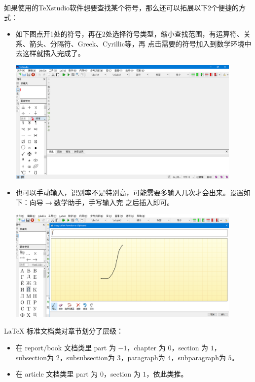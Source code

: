 如果使用的TeXstudio软件想要查找某个符号，那么还可以拓展以下2个便捷的方式：
\begin{itemize}
  \item 如下图点开1处的符号，再在2处选择符号类型，缩小查找范围，有运算符、关系、箭头、分隔符、Greek、Cyrillic等，再
  点击需要的符号加入到数学环境中去这样就插入完成了。

  \includegraphics[width=0.9\textwidth]{../images/5.png}
  \item 也可以手动输入，识别率不是特别高，可能需要多输入几次才会出来。设置如下：向导$\rightarrow$数学助手，手写输入完
  之后插入即可。

  \includegraphics[width=0.9\textwidth]{../images/image.png}
\end{itemize}





\LaTeX{} 标准文档类对章节划分了层级：
\begin{itemize}
  \item 在 report/book 文档类里 part 为 $-1$，chapter 为 $0$，section 为 $1$，
    subsection为 $2$，subsubsection为 $3$，paragraph为 $4$，subparagraph为 $5$。
  \item 在 article 文档类里 part 为 $0$，section 为 $1$，依此类推。
\end{itemize}

